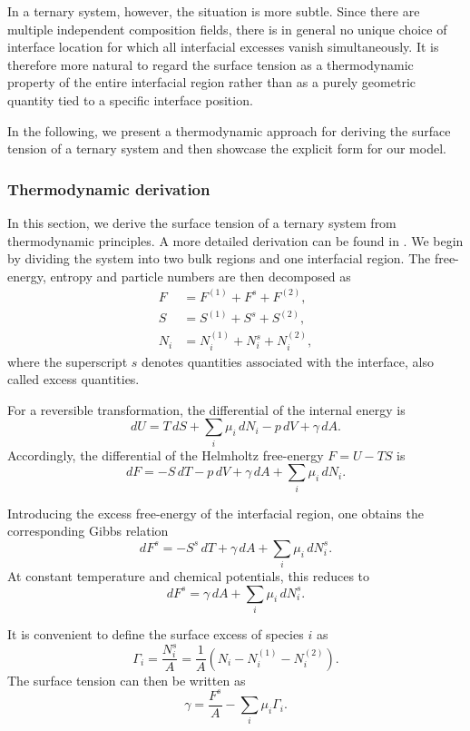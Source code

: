 \documentclass[12pt]{article}
\begin{document}
In a ternary system, however, the situation is more subtle. Since there are multiple independent composition fields, there is in general no unique choice of interface location for which all interfacial excesses vanish simultaneously. It is therefore more natural to regard the surface tension as a thermodynamic property of the entire interfacial region rather than as a purely geometric quantity tied to a specific interface position.

In the following, we present a thermodynamic approach for deriving the surface tension of a ternary system and then showcase the explicit form for our model.

\subsubsection{Thermodynamic derivation}

In this section, we derive the surface tension of a ternary system from thermodynamic principles. A more detailed derivation can be found in \cite{Ip1994}.
We begin by dividing the system into two bulk regions and one interfacial region. The free-energy, entropy and particle numbers are then decomposed as
\[
\begin{aligned}
    F &= F^{(1)} + F^s + F^{(2)}, \\
    S &= S^{(1)} + S^s + S^{(2)}, \\
    N_i &= N_i^{(1)} + N_i^s + N_i^{(2)},
\end{aligned}
\]
where the superscript \(s\) denotes quantities associated with the interface, also called excess quantities.

For a reversible transformation, the differential of the internal energy is
\[
dU = T\,dS + \sum_i \mu_i\,dN_i - p\,dV + \gamma\,dA.
\]
Accordingly, the differential of the Helmholtz free-energy \(F=U-TS\) is
\[
dF = -S\,dT - p\,dV + \gamma\,dA + \sum_i \mu_i\,dN_i.
\]

Introducing the excess free-energy of the interfacial region, one obtains the corresponding Gibbs relation
\[
dF^s = -S^s\,dT + \gamma\,dA + \sum_i \mu_i\,dN_i^s.
\]
At constant temperature and chemical potentials, this reduces to
\[
dF^s = \gamma\,dA + \sum_i \mu_i\,dN_i^s.
\]

It is convenient to define the surface excess of species \(i\) as
\[
\Gamma_i = \frac{N_i^s }{A}= \frac{1}{A}(N_i - N_i^{(1)} - N_i^{(2)}).
\]
The surface tension can then be written as
\begin{equation}
\gamma = \frac{F^s}{A} - \sum_i \mu_i \Gamma_i.
\label{eq:surface_tension_thermodynamic}
\end{equation}
\end{document}
